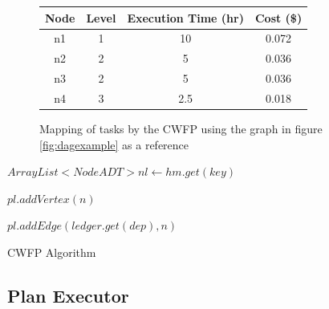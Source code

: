 \documentclass[fleqn,10pt]{SelfArx} %
\begin{document}
\begin{figure}[t!]
\centering
\begin{center}
\begin{tabular}{|| c | c | c | c ||}
	\hline
	\textbf{Node} & \textbf{Level} & \textbf{Execution Time (hr)} & \textbf{Cost (\$)} \\
	\hline\hline
	n1 & 1 & 10 & 0.072 \\
	\hline
	n2 & 2 & 5 & 0.036 \\
	\hline
	n3 & 2 & 5 & 0.036 \\
	\hline
	n4 & 3 & 2.5 & 0.018 \\
	\hline
\end{tabular}
\end{center}
\caption{Mapping of tasks by the CWFP using the graph in figure \ref{fig:dagexample} as a reference}
\label{fig:mapexample}
\end{figure}

\begin{algorithm}
\footnotesize
{}
\DontPrintSemicolon
{}
 {
	$ArrayList<NodeADT> nl \gets hm.get(key)$

	 {
		$pl.addVertex(n)$

		 {

			 {

				$pl.addEdge(ledger.get(dep), n)$
			}
		}
	}
}

\caption{CWFP Algorithm}
\label{alg:algorithm1}
\end{algorithm}

\subsection{Plan Executor}
\end{document}
